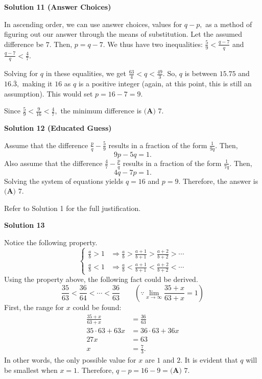 \begin{enumerate}
\textbf{Solution 11 (Answer Choices)}

In ascending order, we can use answer choices, values for $q-p,$ as a method of figuring out our answer through the means of substitution. Let the assumed difference be $7.$ Then, $p=q-7.$ We thus have two inequalities: $\frac{5}{9} < \frac{q-7}{q}$ and $\frac{q-7}{q} < \frac{4}{7}.$

 Solving for $q$ in these equalities, we get $\frac{63}{4} < q < \frac{49}{3}.$ So, $q$ is between $15.75$ and $16.\overline{3},$ making it $16$ as $q$ is a positive integer (again, at this point, this is still an assumption). This would set $p=16-7=9.$

 Since $\frac{5}{9} < \frac{9}{16} < \frac{4}{7},$ the minimum difference is $\boxed{\textbf{(A) } 7}.$




\textbf{Solution 12 (Educated Guess)}

Assume that the difference $\frac{p}{q} - \frac{5}{9}$ results in a fraction of the form $\frac{1}{9q}.$ Then, 
 \[9p - 5q = 1.\]Also assume that the difference $\frac{4}{7} - \frac{p}{q}$ results in a fraction of the form $\frac{1}{7q}.$ Then, 
 \[4q - 7p = 1.\]Solving the system of equations yields $q=16$ and $p=9.$ Therefore, the answer is $\boxed{\textbf{(A) } 7}.$

 Refer to Solution 1 for the full justification.

 



\textbf{Solution 13}

Notice the following property.
 \[\begin{cases}     \frac{a}{b} > 1 &\Rightarrow \frac{a}{b} > \frac{a + 1}{b + 1} > \frac{a + 2}{b + 2} > \cdots \\     \frac{a}{b} < 1 &\Rightarrow \frac{a}{b} < \frac{a + 1}{b + 1} < \frac{a + 2}{b + 2} < \cdots \end{cases}\]Using the property above, the following fact could be derived.
 \[\frac{35}{63} < \frac{36}{64} < \cdots < \frac{36}{63} \qquad \left( \because \lim_{x \rightarrow \infty} \frac{35 + x}{63 + x} = 1 \right)\]First, the range for $x$ could be found:
 \begin{align*}     \frac{35 + x}{63 + x} &= \frac{36}{63} \\     35 \cdot 63 + 63x &= 36 \cdot 63 + 36x \\     27x &= 63 \\     x &= \frac{7}{3}. \end{align*}
In other words, the only possible value for $x$ are $1$ and $2$. It is evident that $q$ will be smallest when $x = 1$. Therefore, $q - p = 16 - 9 = \boxed{\textbf{(A) } 7}$.


\end{enumerate}
